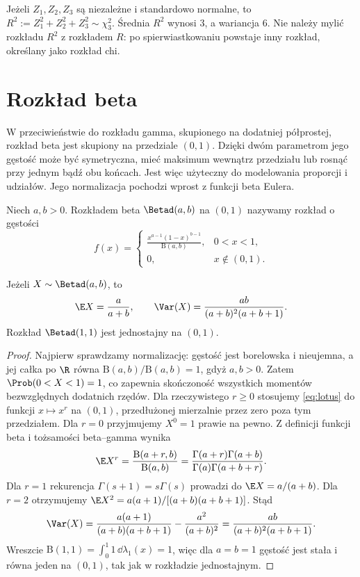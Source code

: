 \begin{przyklad}
Jeżeli $Z_1,Z_2,Z_3$ są niezależne i standardowo normalne,
to $R^2:=Z_1^2+Z_2^2+Z_3^2\sim\chi^2_3$.
Średnia $R^2$ wynosi $3$, a wariancja $6$.
Nie należy mylić rozkładu $R^2$ z rozkładem $R$:
po spierwiastkowaniu powstaje inny rozkład, określany
jako rozkład chi.
\end{przyklad}

\section{Rozkład beta}
W przeciwieństwie do rozkładu gamma, skupionego na dodatniej
półprostej, rozkład beta jest skupiony na przedziale $(0,1)$.
Dzięki dwóm parametrom jego gęstość może być symetryczna,
mieć maksimum wewnątrz przedziału lub rosnąć przy jednym
bądź obu końcach.
Jest więc użyteczny do modelowania proporcji i udziałów.
Jego normalizacja pochodzi wprost z funkcji beta Eulera.

\begin{definicja}
Niech $a,b>0$. Rozkładem beta $\Betad(a,b)$ na $(0,1)$
nazywamy rozkład o gęstości
\begin{equation}\label{eq:beta}
f(x)=
\begin{cases}
\displaystyle\frac{x^{a-1}(1-x)^{b-1}}{\mathrm B(a,b)},&0<x<1,\\
0,&x\notin(0,1).
\end{cases}
\end{equation}
\end{definicja}

\begin{stwierdzenie}
Jeżeli $X\sim\Betad(a,b)$, to
\[
\E X=\frac a{a+b},\qquad
\Var(X)=\frac{ab}{(a+b)^2(a+b+1)}.
\]
Rozkład $\Betad(1,1)$ jest jednostajny na $(0,1)$.
\end{stwierdzenie}
\begin{proof}
Najpierw sprawdzamy normalizację: gęstość jest
borelowska i nieujemna, a jej całka po $\R$ równa
$\mathrm B(a,b)/\mathrm B(a,b)=1$, gdyż $a,b>0$.
Zatem $\Prob(0<X<1)=1$, co zapewnia skończoność
wszystkich momentów bezwzględnych dodatnich rzędów.
Dla rzeczywistego $r\geq0$ stosujemy \eqref{eq:lotus}
do funkcji $x\mapsto x^r$ na $(0,1)$, przedłużonej
mierzalnie przez zero poza tym przedziałem.
Dla $r=0$ przyjmujemy $X^0=1$ prawie na pewno.
Z definicji funkcji beta i tożsamości beta--gamma wynika
\[
\E X^r=\frac{\mathrm B(a+r,b)}{\mathrm B(a,b)}
=\frac{\Gamma(a+r)\Gamma(a+b)}
{\Gamma(a)\Gamma(a+b+r)}.
\]
Dla $r=1$ rekurencja $\Gamma(s+1)=s\Gamma(s)$
prowadzi do $\E X=a/(a+b)$. Dla $r=2$
otrzymujemy
$\E X^2=a(a+1)/[(a+b)(a+b+1)]$.
Stąd
\[
\Var(X)=\frac{a(a+1)}{(a+b)(a+b+1)}
-\frac{a^2}{(a+b)^2}
=\frac{ab}{(a+b)^2(a+b+1)}.
\]
Wreszcie $\mathrm B(1,1)=\int_0^1 1\,\dd\lambda_1(x)=1$,
więc dla $a=b=1$ gęstość jest stała i równa jeden
na $(0,1)$, tak jak w rozkładzie jednostajnym.
\end{proof}

